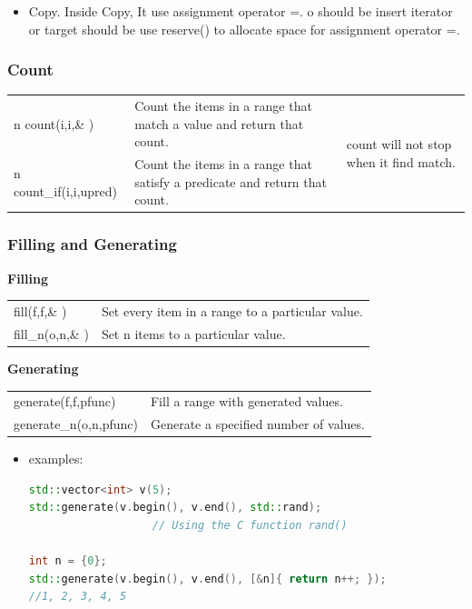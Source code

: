 \documentclass[a4paper,11pt,twoside]{book}
\renewcommand{\hline}{}
\begin{document}
\begin{itemize}
\item Copy.  Inside Copy, It use assignment operator =. o should be insert iterator or target should be use reserve() to allocate space for assignment operator =.
\end{itemize}



\subsubsection{Count}
\begin{tabular}{| p{} |p{}|p{}|}
\hline n count(i,i,\& ) & Count the items in a range that match a value and return that count.& \multirow{2}{*}{ \parbox{0.2\textwidth}{count will not stop when it find match. } }    \\
\cline{1-2} n count\_if(i,i,upred)  & Count the items in a range that satisfy a predicate and return that count. & \\
\hline
\end{tabular}


\subsubsection{Filling and Generating}
\textbf{Filling} \\
\begin{tabular}{| p{} |p{}|}
\hline fill(f,f,\& ) & Set every item in a range to a particular value.  \\
\hline fill\_n(o,n,\& )  & Set n items to a particular value.   \\
\hline
\end{tabular}


\textbf{Generating} \\
\begin{tabular}{| p{} |p{}|}
\hline generate(f,f,pfunc)  & Fill a range with generated values.   \\
\hline generate\_n(o,n,pfunc)  & Generate a specified number of values.   \\
\hline
\end{tabular}

\begin{itemize}
\item examples:
\begin{lstlisting}[frame=single, language=c++]
std::vector<int> v(5);
std::generate(v.begin(), v.end(), std::rand);
                   // Using the C function rand()

int n = {0};
std::generate(v.begin(), v.end(), [&n]{ return n++; });
//1, 2, 3, 4, 5
\end{lstlisting}

\end{itemize}
\end{document}

